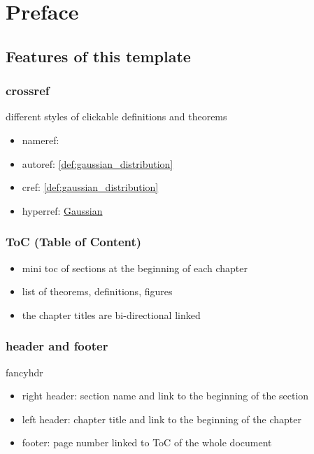 \chapter*{Preface}
\minitoc


\section{Features of this template}
\subsection{crossref}
different styles of clickable definitions and theorems
\begin{itemize}
	\item nameref:

	\item autoref:
		\autoref{def:gaussian_distribution}

	\item cref:
		\cref{def:gaussian_distribution}

	\item hyperref:
		\hyperref[def:gaussian_distribution]{Gaussian}
\end{itemize}

\subsection{ToC (Table of Content)}
\begin{itemize}
	\item mini toc of sections at the beginning of each chapter
	\item list of theorems, definitions, figures
	\item the chapter titles are bi-directional linked
\end{itemize}

\subsection{header and footer}
fancyhdr
\begin{itemize}
	\item right header: section name and link to the beginning of the section
	\item left header: chapter title and link to the beginning of the chapter
	\item footer: page number linked to ToC of the whole document
\end{itemize}

